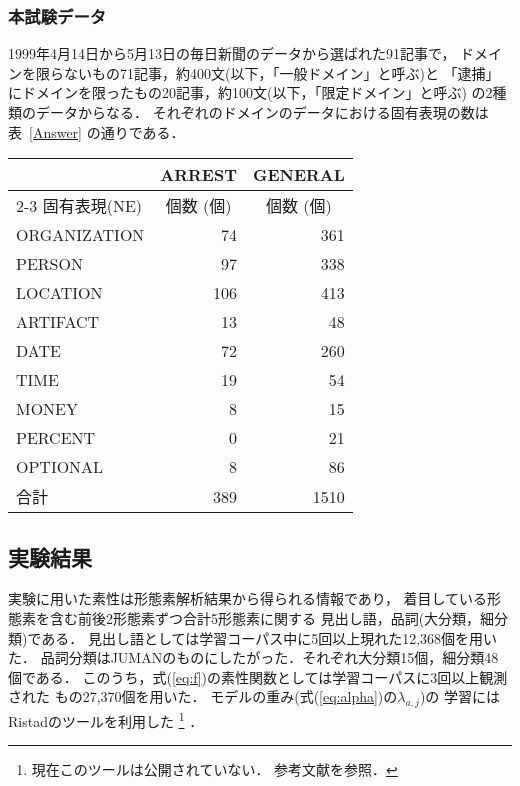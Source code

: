 \subsubsection{本試験データ}

1999年4月14日から5月13日の毎日新聞のデータから選ばれた91記事で，
ドメインを限らないもの71記事，約400文(以下，「一般ドメイン」と呼ぶ)と
「逮捕」にドメインを限ったもの20記事，約100文(以下，「限定ドメイン」と呼ぶ)
の2種類のデータからなる．
それぞれのドメインのデータにおける固有表現の数は表~\ref{Answer} の通りである．

\begin{table*}[htbp]
  \begin{center}
    \caption{IREX-NE本試験データに対する固有表現の内訳}
    \label{Answer} 
    \begin{tabular}{|l|r|r|}
      \hline
      & \multicolumn{1}{c|}{ARREST} & \multicolumn{1}{c|}{GENERAL}\\
      \cline{2-3}
      固有表現(NE) & \multicolumn{1}{c|}{個数 (個)} 
      & \multicolumn{1}{c|}{個数 (個)} \\
      \hline      
      ORGANIZATION &  74 & 361 \\
      PERSON       &  97 & 338 \\
      LOCATION     & 106 & 413 \\
      ARTIFACT     &  13 &  48 \\
      DATE         &  72 & 260 \\
      TIME         &  19 &  54 \\
      MONEY        &   8 &  15 \\
      PERCENT      &   0 &  21 \\
      OPTIONAL     &   8 &  86 \\
      \hline
      合計 & 389 & 1510 \\
      \hline
    \end{tabular}
  \end{center}
\end{table*}

\subsection{実験結果}
\label{sec:experimental_results}

実験に用いた素性は形態素解析結果から得られる情報であり，
着目している形態素を含む前後2形態素ずつ合計5形態素に関する
見出し語，品詞(大分類，細分類)である．
見出し語としては学習コーパス中に5回以上現れた12,368個を用いた．
品詞分類はJUMANのものにしたがった．それぞれ大分類15個，細分類48個である．
このうち，式(\ref{eq:f})の素性関数としては学習コーパスに3回以上観測された
もの27,370個を用いた．
モデルの重み(式(\ref{eq:alpha})の$\lambda_{a,j}$)の
学習にはRistadのツール\cite{ristad98}を利用した
\footnote{
  現在このツールは公開されていない．
  参考文献\cite{ristad97}を参照．
}
．

